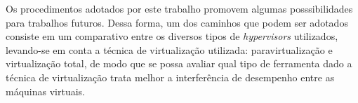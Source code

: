 \documentclass[[10pt,journal]{IEEEtran}
\begin{document}
Os procedimentos adotados por este trabalho promovem algumas posssibilidades para trabalhos futuros. Dessa forma, um dos caminhos que podem ser adotados consiste em um comparativo entre os diversos tipos de \textit{hypervisors} utilizados, levando-se em conta a técnica de virtualização utilizada: paravirtualização e virtualização total, de modo que se possa avaliar qual tipo de ferramenta dado a técnica de virtualização trata melhor a interferência de desempenho entre as máquinas virtuais.



\end{document}

